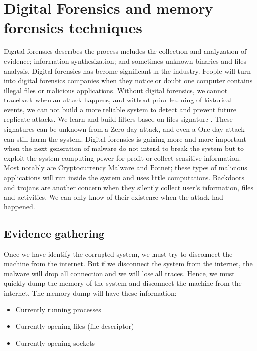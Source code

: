 \section[Digital Forensics and memory forensics techniques]{Digital Forensics and memory forensics techniques}

Digital forensics describes the process includes the collection and analyzation of evidence; information synthesization; and sometimes unknown binaries and files analysis. Digital forensics has become significant in the industry. People will turn into digital forensics companies when they notice or doubt one computer contains illegal files or malicious applications. Without digital forensics, we cannot traceback when an attack happens, and without prior learning of historical events, we can not build a more reliable system to detect and prevent future replicate attacks. We learn and build filters based on files signature \cite{yararules}. These signatures can be unknown from a Zero-day attack, and even a One-day attack can still harm the system. Digital forensics is gaining more and more important when the next generation of malware do not intend to break the system but to exploit the system computing power for profit or collect sensitive information. Most notably are Cryptocurrency Malware and Botnet; these types of malicious applications will run inside the system and uses little computations. Backdoors and trojans are another concern when they silently collect user's information, files and activities. We can only know of their existence when the attack had happened.

\subsection[Evidence gathering]{Evidence gathering}

Once we have identify the corrupted system, we must try to disconnect the machine from the internet. But if we disconnect the system from the internet, the malware will drop all connection and we will lose all traces. Hence, we must quickly dump the memory of the system and disconnect the machine from the internet. The memory dump will have these information:

\begin{itemize}
\item Currently running processes
\item Currently opening files (file descriptor)
\item Currently opening sockets
\end{itemize}

